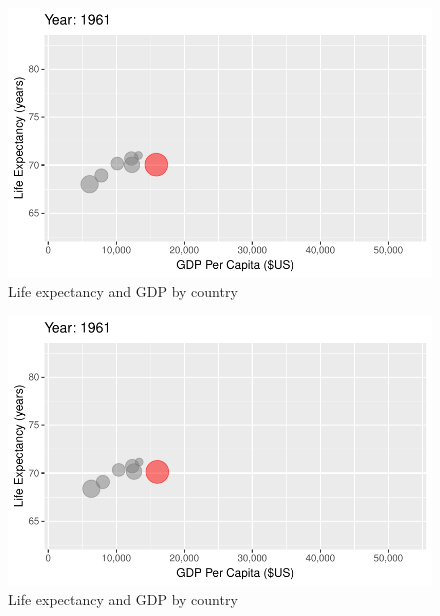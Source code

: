 \documentclass[
  letterpaper,
  DIV=11,
  numbers=noendperiod]{scrreport}
\theoremstyle{definition}
\theoremstyle{remark}
\begin{document}
\begin{figure}

{\centering \includegraphics{index_files/figure-pdf/fig-anim-country-17.pdf}

}

\caption{\label{fig-anim-country-17}Life expectancy and GDP by country}

\end{figure}

\begin{figure}

{\centering \includegraphics{index_files/figure-pdf/fig-anim-country-18.pdf}

}

\caption{\label{fig-anim-country-18}Life expectancy and GDP by country}

\end{figure}
\end{document}
